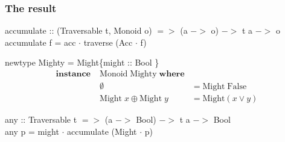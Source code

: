 \documentclass[18pt]{beamer}
\begin{document}
\begin{frame}[fragile] \frametitle{The result}

accumulate :: (Traversable t, Monoid o) $=>$ (a $->$ o) $->$ t a $->$ o
accumulate f = acc $\cdot$ traverse (Acc $\cdot$ f)

newtype Mighty = Might\{might :: Bool \}
\begin{align*}
\mathbf{instance} \; &\mathrm{Monoid \;  Mighty} \; \mathbf{where}\\
&\emptyset &= \mathrm{Might} \; \mathrm{False}\\
&\mathrm{Might}\; x \oplus \mathrm{Might}\; y &= \mathrm{Might} (x \lor y)
\end{align*}

any :: Traversable t $=>$ (a $->$ Bool) $->$ t a $->$ Bool\\
any p = might $\cdot$ accumulate (Might $\cdot$ p)
\end{frame}
\end{document}
